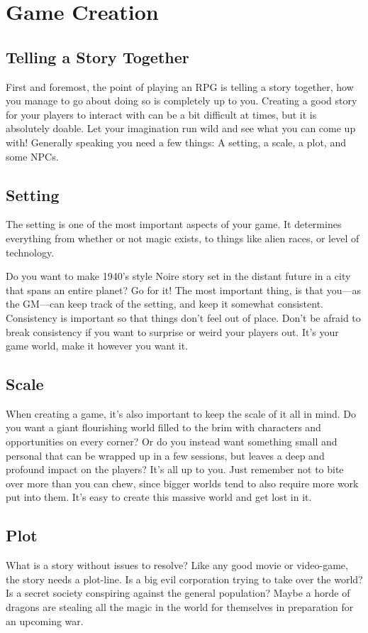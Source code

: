 \chapter{Game Creation}
\section{Telling a Story Together}
First and foremost, the point of playing an RPG is telling a story together, how you manage to go about doing so is completely up to you.
Creating a good story for your players to interact with can be a bit difficult at times, but it is absolutely doable.
Let your imagination run wild and see what you can come up with!
Generally speaking you need a few things: A setting, a scale, a plot, and some NPCs.

\section{Setting}
The setting is one of the most important aspects of your game.
It determines everything from whether or not magic exists, to things like alien races, or level of technology.

Do you want to make 1940's style Noire story set in the distant future in a city that spans an entire planet? Go for it!
The most important thing, is that you---as the GM---can keep track of the setting, and keep it somewhat consistent.
Consistency is important so that things don't feel out of place. 
Don't be afraid to break consistency if you want to surprise or weird your players out.
It's your game world, make it however you want it.

\section{Scale}
When creating a game, it's also important to keep the scale of it all in mind.
Do you want a giant flourishing world filled to the brim with characters and opportunities on every corner? 
Or do you instead want something small and personal that can be wrapped up in a few sessions, but leaves a deep and profound impact on the players?
It's all up to you.
Just remember not to bite over more than you can chew, since bigger worlds tend to also require more work put into them.
It's easy to create this massive world and get lost in it.

\section{Plot}
What is a story without issues to resolve? Like any good movie or video-game, the story needs a plot-line.
Is a big evil corporation trying to take over the world?
Is a secret society conspiring against the general population?
Maybe a horde of dragons are stealing all the magic in the world for themselves in preparation for an upcoming war.

